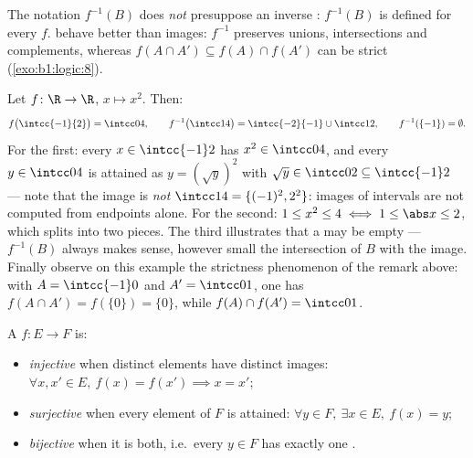 \begin{remark}
The notation $f^{-1}(B)$ does \emph{not} presuppose an inverse :
$f^{-1}(B)$ is defined for every $f$.  behave better than
images: $f^{-1}$ preserves unions, intersections and complements,
whereas $f(A \cap A') \subseteq f(A) \cap f(A')$ can be strict
(\cref{exo:b1:logic:8}).
\end{remark}

\begin{example}\label{ex:b1:logic:images}
Let $f \colon \R \to \R$, $x \mapsto x^2$. Then:
\[
f\bigl(\intcc{-1}{2}\bigr) = \intcc04, \qquad
f^{-1}\bigl(\intcc14\bigr) = \intcc{-2}{-1} \cup \intcc12, \qquad
f^{-1}(\{-1\}) = \emptyset .
\]
For the first: every $x \in \intcc{-1}2$ has $x^2 \in \intcc04$, and
every $y \in \intcc04$ is attained as $y = (\sqrt y)^2$ with $\sqrt y
\in \intcc02 \subseteq \intcc{-1}2$ --- note that the image is
\emph{not} $\intcc14 = \{(-1)^2, 2^2\}$: images of intervals are not
computed from endpoints alone. For the second: $1 \leq x^2 \leq 4 \iff
1 \leq \abs x \leq 2$, which splits into two pieces. The third
illustrates that a  may be empty --- $f^{-1}(B)$ always makes
sense, however small the intersection of $B$ with the image. Finally
observe on this example the strictness phenomenon of the remark above:
with $A = \intcc{-1}0$ and $A' = \intcc01$, one has $f(A \cap A') =
f(\{0\}) = \{0\}$, while $f(A) \cap f(A') = \intcc01$.
\end{example}

\begin{definition}\label{def:b1:logic:inj}
A  $f \colon E \to F$ is:
\begin{itemize}
  \item \emph{injective} when distinct elements have
        distinct images: $\forall x, x' \in E,\ f(x) = f(x') \implies
        x = x'$;
  \item \emph{surjective} when every element of $F$
        is attained: $\forall y \in F,\ \exists x \in E,\ f(x) = y$;
  \item \emph{bijective} when it is both, i.e.\ every
        $y \in F$ has exactly one .
\end{itemize}
\end{definition}

